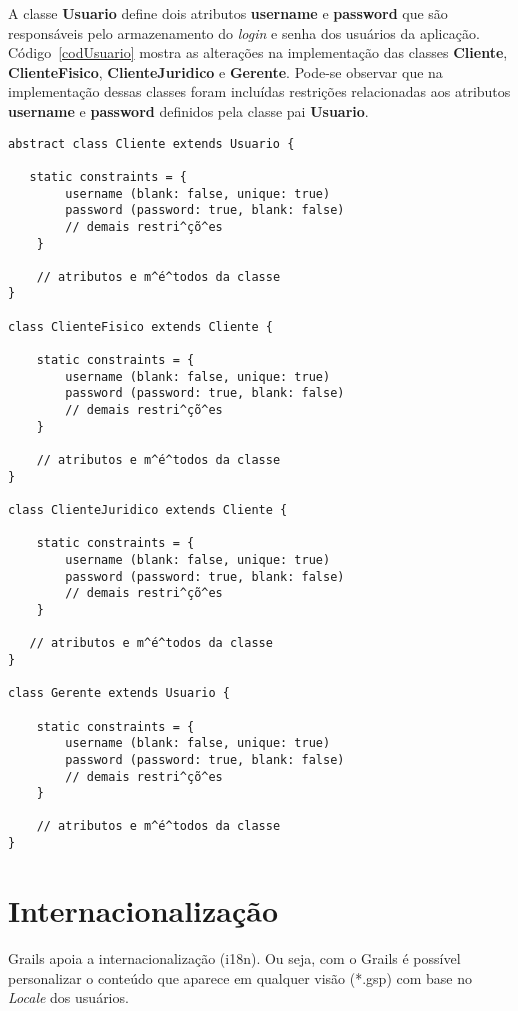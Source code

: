 A classe {\bf Usuario} define dois atributos {\bf username} e {\bf password} que
são  responsáveis pelo  armazenamento do  {\it login}  e senha  dos  usuários da
aplicação.   Código~\ref{codUsuario}  mostra   as  alterações  na  implementação
das  classes {\bf Cliente},  {\bf ClienteFisico},  {\bf ClienteJuridico}  e {\bf
  Gerente}.   Pode-se  observar  que   na  implementação  dessas  classes  foram
incluídas  restrições   relacionadas  aos   atributos  {\bf  username}   e  {\bf
  password} definidos pela classe pai {\bf Usuario}. 

\begin{lstlisting}[caption=Usuários:   Clientes  e   Gerentes,  frame   =  trBL,
    float=htbp, label=codUsuario] 
abstract class Cliente extends Usuario {  
 
   static constraints = {
        username (blank: false, unique: true)
        password (password: true, blank: false)
        // demais restri^çõ^es
    }

    // atributos e m^é^todos da classe
}

class ClienteFisico extends Cliente {
    
    static constraints = {
        username (blank: false, unique: true)
        password (password: true, blank: false)
        // demais restri^çõ^es
    }
    
    // atributos e m^é^todos da classe
}

class ClienteJuridico extends Cliente {
    
    static constraints = {
        username (blank: false, unique: true)
        password (password: true, blank: false)
        // demais restri^çõ^es
    }
    
   // atributos e m^é^todos da classe
}

class Gerente extends Usuario {

    static constraints = {
        username (blank: false, unique: true)
        password (password: true, blank: false)
        // demais restri^çõ^es
    }
   
    // atributos e m^é^todos da classe
}
\end{lstlisting}

\section{Internacionalização}\label{I18n}

Grails  apoia a internacionalização  (i18n). Ou  seja, com  o Grails  é possível
personalizar o conteúdo  que aparece em qualquer visão (*.gsp)  com base no {\it
  Locale} dos usuários. 

